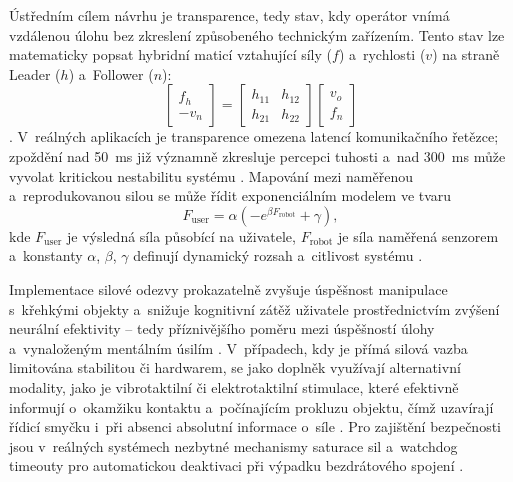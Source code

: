 Ústředním cílem návrhu je transparence, tedy stav, kdy operátor vnímá vzdálenou úlohu bez zkreslení způsobeného technickým zařízením.
Tento stav lze matematicky popsat hybridní maticí vztahující síly ($f$) a~rychlosti ($v$) na straně Leader ($h$) a~Follower ($n$):
%
\begin{equation}
    \begin{bmatrix} f_h \\ -v_n \end{bmatrix} =
    \begin{bmatrix} h_{11} & h_{12} \\ h_{21} & h_{22} \end{bmatrix}
    \begin{bmatrix} v_o \\ f_n \end{bmatrix}
\end{equation}
%
\cite{Black2025, Almeida202098}.
V~reálných aplikacích je transparence omezena latencí komunikačního řetězce; zpoždění nad 50~ms již významně zkresluje percepci tuhosti a~nad 300~ms může vyvolat kritickou nestabilitu systému \cite{Patel2022, Almeida202098, Bolarinwa2022}.
Mapování mezi naměřenou a~reprodukovanou silou se může řídit exponenciálním modelem ve tvaru
%
\begin{equation}
    F_{\mathrm{user}} = \alpha\left(-e^{\beta F_{\mathrm{robot}}} + \gamma\right),
\end{equation}
%
kde $F_{\mathrm{user}}$ je výsledná síla působící na uživatele, $F_{\mathrm{robot}}$ je síla naměřená senzorem a~konstanty $\alpha$, $\beta$, $\gamma$ definují dynamický rozsah a~citlivost systému \cite{Park2022}.

Implementace silové odezvy prokazatelně zvyšuje úspěšnost manipulace s~křehkými objekty a~snižuje kognitivní zátěž uživatele prostřednictvím zvýšení neurální efektivity -- tedy příznivějšího poměru mezi úspěšností úlohy a~vynaloženým mentálním úsilím \cite{Thomas2023110, Park2022, Ninu2014, Chai2022}.
V~případech, kdy je přímá silová vazba limitována stabilitou či hardwarem, se jako doplněk využívají alternativní modality, jako je vibrotaktilní či elektrotaktilní stimulace, které efektivně informují o~okamžiku kontaktu a~počínajícím prokluzu objektu, čímž uzavírají řídicí smyčku i~při absenci absolutní informace o~síle \cite{Ninu2014, Chai2022, Mayer2020427}.
Pro zajištění bezpečnosti jsou v~reálných systémech nezbytné mechanismy saturace sil a~watchdog timeouty pro automatickou deaktivaci při výpadku bezdrátového spojení \cite{Patel2022, GIUDICI2025}.

